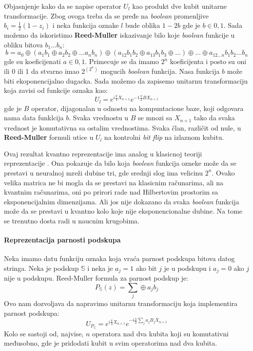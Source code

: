 \documentclass[12pt, letterpaper, oneside]{article}
\begin{document}
Objasnjenje kako da se napise operator $U_l$ kao produkt dve kubit unitarne transformacije. Zbog ovoga treba da se pređe na \textit{boolean} promenljive $b_i=\frac{1}{2}(1-z_i)$ i 
neka funkcija oznake $l$ bude oblika $1-2b$ gde je $b \in {0,1}$. Sada možemo da iskoristimo \textbf{Reed-Muller} iskazivanje bilo koje \textit{boolean} funkcije u obliku bitova $b_1 \dots b_n$:
\[
    b = a_0 \oplus (a_1b_1 \oplus a_2b_2 \oplus \dots a_nb_n) \oplus (a_{12}b_1b_2 \oplus a_{13}b_1b_3 \oplus \dots) \oplus \dots \oplus a_{12 \dots n}b_1b_2 \dots b_n
\]
gde su koeficijenati $a \in {0,1}$. Primecuje se da imamo $2^n$ koeficijenta i posto su oni ili 0 ili 1 da stvarno imao
$2^{(2^n)}$ mogucih \textit{boolean} funkcija. Nasa funkcija $b$ može biti ekoponencijalno dugacka.
Sada možemo da zapisemo unitarnu transformaciju koja zavisi od funkcije oznaka kao:
\[
    U_l = e^{i\frac{\pi}{4}X_{n+1}}e^{-1\frac{\pi}{2}BX_{n+1}}
\]
gde je $B$ operator, dijagonalan u odnostu na kompuntacione baze, koji odgovara nama data funklcija $b$. 
Svaka vrednostu u $B$ se mnozi sa $X_{n+1}$ tako da svaka vrednost je komutativna sa ostalim vrednostima. 
Svaka član, različit od nule, u \textbf{Reed-Muller} formuli utice u $U_l$ na kontrolni \textit{bit flip} na izlaznom kubitu.

Ovaj rezultat kvantno reprezentacije ima analog u klasicnoj teoriji \\
reprezentacije \cite{Cybenko1989ApproximationBS}.
Ona pokazuje da bilo koja \textit{boolean} funkcija ozneke može da se prestavi u neuralnoj mreži dubine tri, gde srednji slog 
ima velicinu $2^n$. Ovako velika matrica ne bi mogla da se prestavi na klasicnim računarima, ali na kvantnim računarima, oni po prirori rade
nad Hilbertovim prostorim sa eksponencijalnim dimenzijama. Ali jos nije dokazano da svaka \textit{boolean} funkcija može da se prestavi u
kvantno kolo koje nije eksponencionalne dubine. Na tome se trenutno dosta radi u naucnim krugobima.

\paragraph*{Reprezentacija parnosti podskupa}
Neka imamo datu funkciju oznaka koja vraća parnost podskupa bitova datog stringa. Neka je podskup $\mathbb{S}$
i neka je $a_j=1$ ako bit $j$ je u podskupu i $a_j=0$ ako $j$ nije u podskupu. Reed-Muller formula za parnost podskup je:
\[
    P_{\mathbb{S}}(z) = \sum_j \oplus a_jb_j
\]
Ovo nam dozvoljava da napravimo unitarnu transformaciju koja implementira parnost podskupa:
\[
    U_{P_{\mathbb{S}}} = e^{i\frac{\pi}{4}X_{n+1}}e^{-i\frac{\pi}{2}\sum_j a_jB_jX_{n+1}}
\]
Kolo se sastoji od, najvise, $n$ operatora nad dva kubita koji su komutativni međusobno, gde je pridodati kubit u svim operatorima nad dva kubita.
\end{document}
